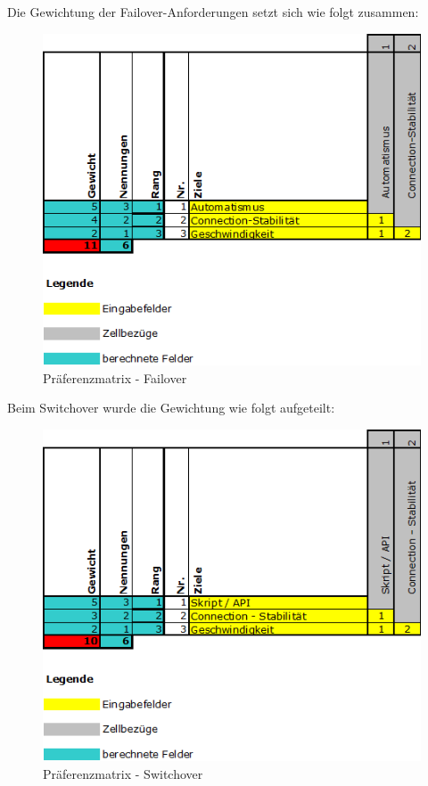 \begin{flushleft}
    Die Gewichtung der Failover-Anforderungen setzt sich wie folgt zusammen:
    \begin{figure}[H]
        \centering
        \includegraphics[width=1\linewidth]{source/implementation/evaluation/requirements/preference_matrix_failover}
        \caption{Präferenzmatrix - Failover}
        \label{fig:preference_matrix_failover}
    \end{figure}
\end{flushleft}
\begin{flushleft}
    Beim Switchover wurde die Gewichtung wie folgt aufgeteilt:
    \begin{figure}[H]
        \centering
        \includegraphics[width=1\linewidth]{source/implementation/evaluation/requirements/preference_matrix_switchover}
        \caption{Präferenzmatrix - Switchover}
        \label{fig:preference_matrix_switchover}
    \end{figure}
\end{flushleft}
